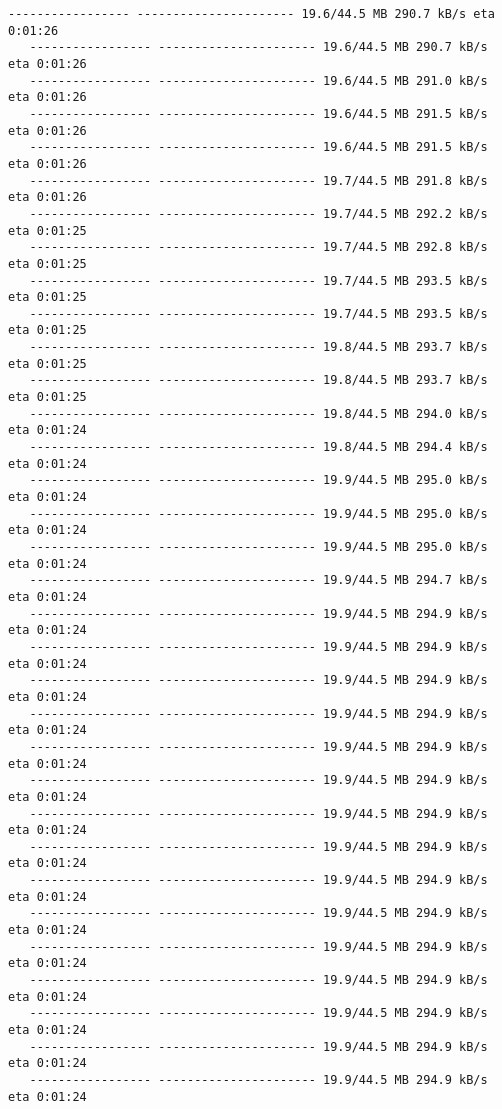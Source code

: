 \documentclass[11pt]{article}
\begin{document}
\begin{Verbatim}[commandchars=\\\{\}]
   ----------------- ---------------------- 19.6/44.5 MB 290.7 kB/s eta 0:01:26
   ----------------- ---------------------- 19.6/44.5 MB 290.7 kB/s eta 0:01:26
   ----------------- ---------------------- 19.6/44.5 MB 291.0 kB/s eta 0:01:26
   ----------------- ---------------------- 19.6/44.5 MB 291.5 kB/s eta 0:01:26
   ----------------- ---------------------- 19.6/44.5 MB 291.5 kB/s eta 0:01:26
   ----------------- ---------------------- 19.7/44.5 MB 291.8 kB/s eta 0:01:26
   ----------------- ---------------------- 19.7/44.5 MB 292.2 kB/s eta 0:01:25
   ----------------- ---------------------- 19.7/44.5 MB 292.8 kB/s eta 0:01:25
   ----------------- ---------------------- 19.7/44.5 MB 293.5 kB/s eta 0:01:25
   ----------------- ---------------------- 19.7/44.5 MB 293.5 kB/s eta 0:01:25
   ----------------- ---------------------- 19.8/44.5 MB 293.7 kB/s eta 0:01:25
   ----------------- ---------------------- 19.8/44.5 MB 293.7 kB/s eta 0:01:25
   ----------------- ---------------------- 19.8/44.5 MB 294.0 kB/s eta 0:01:24
   ----------------- ---------------------- 19.8/44.5 MB 294.4 kB/s eta 0:01:24
   ----------------- ---------------------- 19.9/44.5 MB 295.0 kB/s eta 0:01:24
   ----------------- ---------------------- 19.9/44.5 MB 295.0 kB/s eta 0:01:24
   ----------------- ---------------------- 19.9/44.5 MB 295.0 kB/s eta 0:01:24
   ----------------- ---------------------- 19.9/44.5 MB 294.7 kB/s eta 0:01:24
   ----------------- ---------------------- 19.9/44.5 MB 294.9 kB/s eta 0:01:24
   ----------------- ---------------------- 19.9/44.5 MB 294.9 kB/s eta 0:01:24
   ----------------- ---------------------- 19.9/44.5 MB 294.9 kB/s eta 0:01:24
   ----------------- ---------------------- 19.9/44.5 MB 294.9 kB/s eta 0:01:24
   ----------------- ---------------------- 19.9/44.5 MB 294.9 kB/s eta 0:01:24
   ----------------- ---------------------- 19.9/44.5 MB 294.9 kB/s eta 0:01:24
   ----------------- ---------------------- 19.9/44.5 MB 294.9 kB/s eta 0:01:24
   ----------------- ---------------------- 19.9/44.5 MB 294.9 kB/s eta 0:01:24
   ----------------- ---------------------- 19.9/44.5 MB 294.9 kB/s eta 0:01:24
   ----------------- ---------------------- 19.9/44.5 MB 294.9 kB/s eta 0:01:24
   ----------------- ---------------------- 19.9/44.5 MB 294.9 kB/s eta 0:01:24
   ----------------- ---------------------- 19.9/44.5 MB 294.9 kB/s eta 0:01:24
   ----------------- ---------------------- 19.9/44.5 MB 294.9 kB/s eta 0:01:24
   ----------------- ---------------------- 19.9/44.5 MB 294.9 kB/s eta 0:01:24
   ----------------- ---------------------- 19.9/44.5 MB 294.9 kB/s eta 0:01:24

\end{Verbatim}
\end{document}
